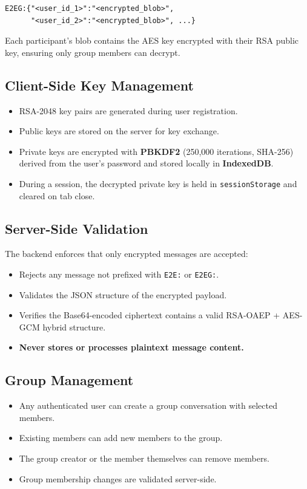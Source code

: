 \documentclass[12pt,a4paper]{article}
\begin{document}
\begin{lstlisting}
E2EG:{"<user_id_1>":"<encrypted_blob>",
      "<user_id_2>":"<encrypted_blob>", ...}
\end{lstlisting}

Each participant's blob contains the AES key encrypted with their RSA public key, ensuring only group members can decrypt.

\subsection{Client-Side Key Management}
\begin{itemize}
  \item RSA-2048 key pairs are generated during user registration.
  \item Public keys are stored on the server for key exchange.
  \item Private keys are encrypted with \textbf{PBKDF2} (250,000 iterations, SHA-256) derived from the user's password and stored locally in \textbf{IndexedDB}.
  \item During a session, the decrypted private key is held in \texttt{sessionStorage} and cleared on tab close.
\end{itemize}

\subsection{Server-Side Validation}
The backend enforces that only encrypted messages are accepted:
\begin{itemize}
  \item Rejects any message not prefixed with \texttt{E2E:} or \texttt{E2EG:}.
  \item Validates the JSON structure of the encrypted payload.
  \item Verifies the Base64-encoded ciphertext contains a valid RSA-OAEP + AES-GCM hybrid structure.
  \item \textbf{Never stores or processes plaintext message content.}
\end{itemize}

\subsection{Group Management}
\begin{itemize}
  \item Any authenticated user can create a group conversation with selected members.
  \item Existing members can add new members to the group.
  \item The group creator or the member themselves can remove members.
  \item Group membership changes are validated server-side.
\end{itemize}
\end{document}
